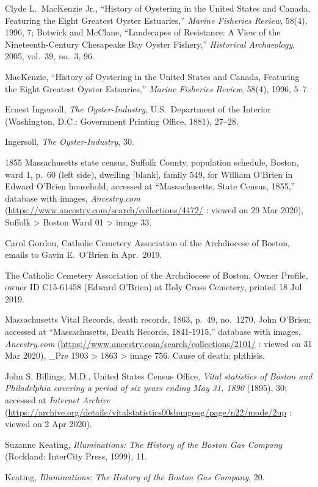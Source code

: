 \begin{thebibliography}{999}
Clyde L.\ MacKenzie Jr., ``History of Oystering in the United States and Canada, Featuring the Eight Greatest Oyster Estuaries,'' \textit{Marine Fisheries Review}, 58(4), 1996, 7; Botwick and McClane, ``Landscapes of Resistance: A View of the Nineteenth-Century Chesapeake Bay Oyster Fishery,''  \textit{Historical Archaeology}, 2005, vol.\ 39, no.\ 3, 96.

MacKenzie, ``History of Oystering in the United States and Canada, Featuring the Eight Greatest Oyster Estuaries,'' \textit{Marine Fisheries Review}, 58(4), 1996, 5--7.

Ernest Ingersoll, \textit{The Oyster-Industry}, U.S.\ Department of the Interior (Washington, D.C.: Government Printing Office, 1881), 27--28.

Ingersoll, \textit{The Oyster-Industry}, 30.

1855 Massachusetts state census, Suffolk County, population schedule, Boston, ward 1, p.\ 60 (left side), dwelling [blank], family 549, for William O'Brien in Edward O'Brien household; accessed at ``Massachusetts, State Census, 1855,'' database with images, \textit{Ancestry.com} (\url{https://www.ancestry.com/search/collections/4472/} : viewed on 29 Mar 2020), Suffolk > Boston Ward 01 > image 33.

Carol Gordon, Catholic Cemetery Association of the Archdiocese of Boston, emails to Gavin E.\ O'Brien in Apr.\ 2019.

The Catholic Cemetery Association of the Archdiocese of Boston, Owner Profile, owner ID C15-61458 (Edward O'Brien) at Holy Cross Cemetery, printed 18 Jul 2019.

Massachusetts Vital Records, death records, 1863, p.\ 49, no.\ 1270, John O'Brien; accessed at ``Massachusetts, Death Records, 1841-1915,'' database with images, \textit{Ancestry.com} (\url{https://www.ancestry.com/search/collections/2101/} : viewed on 31 Mar 2020), \_Pre 1903 > 1863 > image 756. Cause of death: phthisis.

John S. Billings, M.D., United States Census Office, \textit{Vital statistics of Boston and Philadelphia covering a period of six years ending May 31, 1890} (1895), 30; accessed at \textit{Internet Archive} (\url{https://archive.org/details/vitalstatistics00shungoog/page/n22/mode/2up} : viewed on 2 Apr 2020). 

Suzanne Keating, \textit{Illuminations: The History of the Boston Gas Company} (Rockland: InterCity Press, 1999), 11.

Keating, \textit{Illuminations: The History of the Boston Gas Company}, 20.

\end{thebibliography}
